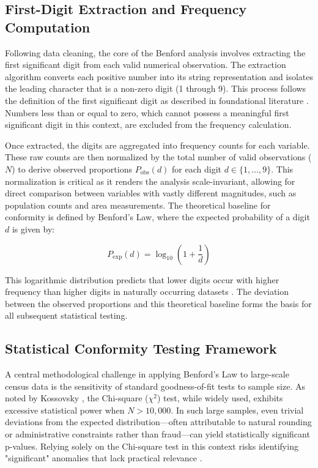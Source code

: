 \documentclass[11pt,a4paper]{article}
\begin{document}
\subsection{First-Digit Extraction and Frequency Computation}
Following data cleaning, the core of the Benford analysis involves extracting the first significant digit from each valid numerical observation. The extraction algorithm converts each positive number into its string representation and isolates the leading character that is a non-zero digit (1 through 9). This process follows the definition of the first significant digit as described in foundational literature \cite{Hill1998TheFD}. Numbers less than or equal to zero, which cannot possess a meaningful first significant digit in this context, are excluded from the frequency calculation.

Once extracted, the digits are aggregated into frequency counts for each variable. These raw counts are then normalized by the total number of valid observations ($N$) to derive observed proportions $P_{\text{obs}}(d)$ for each digit $d \in \{1, \dots, 9\}$. This normalization is critical as it renders the analysis scale-invariant, allowing for direct comparison between variables with vastly different magnitudes, such as population counts and area measurements. The theoretical baseline for conformity is defined by Benford's Law, where the expected probability of a digit $d$ is given by:

$$ P_{\text{exp}}(d) = \log_{10}\left(1 + \frac{1}{d}\right) $$

This logarithmic distribution predicts that lower digits occur with higher frequency than higher digits in naturally occurring datasets \cite{Kossovsky2021OnTM}. The deviation between the observed proportions and this theoretical baseline forms the basis for all subsequent statistical testing.

\subsection{Statistical Conformity Testing Framework}
A central methodological challenge in applying Benford's Law to large-scale census data is the sensitivity of standard goodness-of-fit tests to sample size. As noted by Kossovsky \cite{Kossovsky2021OnTM}, the Chi-square ($\chi^2$) test, while widely used, exhibits excessive statistical power when $N > 10,000$. In such large samples, even trivial deviations from the expected distribution—often attributable to natural rounding or administrative constraints rather than fraud—can yield statistically significant p-values. Relying solely on the Chi-square test in this context risks identifying "significant" anomalies that lack practical relevance \cite{Cerqueti2021SomeNT}.
\end{document}
